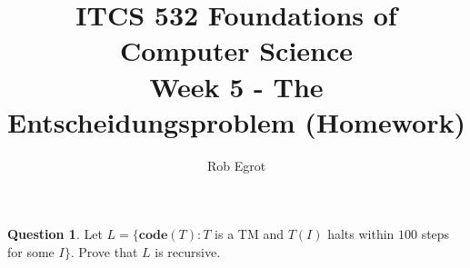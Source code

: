 \documentclass{article}
\title{ITCS 532 Foundations of Computer Science\\
Week 5 - The Entscheidungsproblem (Homework)}
\author{Rob Egrot}
\date{}
\theoremstyle{definition}
\newtheorem{Q}{Question}
\newcommand{\co}{\mathbf{code}}
\begin{document}
\maketitle

\begin{Q}
Let $L=\{\co(T):T$ is a TM and $T(I)$ halts within $100$ steps for some $I\}$. Prove that $L$ is recursive.
\end{Q}
\begin{comment}
\textbf{Solution} \\
Only strings whose length is at most 100 are relevant. We use a Turing machine that simulates $T(I)$ on every string whose length is at most 100, while simultaneously keeping track of the number of simulated steps. If $T(I)$ halts within 100 steps then we accept. If $T(I)$ does not halt within 100 steps we move onto the next string. If we get through all the strings then we reject. 
\end{comment}
\end{document}

